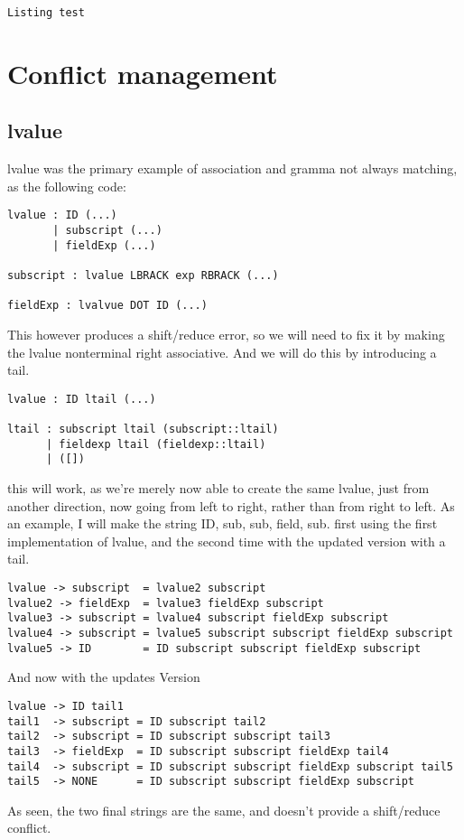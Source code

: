 \documentclass{article}
\begin{document}
\begin{lstlisting}[frame=single]
Listing test
\end{lstlisting}

\section{Conflict management}

\subsection{lvalue}
lvalue was the primary example of association and gramma not always matching, as the following code:
\begin{lstlisting}[frame=single]
lvalue : ID (...)
	   | subscript (...)
	   | fieldExp (...)

subscript : lvalue LBRACK exp RBRACK (...)

fieldExp : lvalvue DOT ID (...)

\end{lstlisting}

This however produces a shift/reduce error, so we will need to fix it by making the lvalue nonterminal right associative. And we will do this by introducing a tail.

\begin{lstlisting}[frame=single]
lvalue : ID ltail (...)

ltail : subscript ltail (subscript::ltail)
      | fieldexp ltail (fieldexp::ltail)
      | ([])
\end{lstlisting}

this will work, as we're merely now able to create the same lvalue, just from another direction, now going from left to right, rather than from right to left.
As an example, I will make the string ID, sub, sub, field, sub. first using the first implementation of lvalue, and the second time with the updated version with a tail.

\begin{lstlisting}[frame=single]
lvalue -> subscript  = lvalue2 subscript
lvalue2 -> fieldExp  = lvalue3 fieldExp subscript
lvalue3 -> subscript = lvalue4 subscript fieldExp subscript
lvalue4 -> subscript = lvalue5 subscript subscript fieldExp subscript
lvalue5 -> ID        = ID subscript subscript fieldExp subscript
\end{lstlisting}
And now with the updates Version
\begin{lstlisting}[frame=single]
lvalue -> ID tail1
tail1  -> subscript = ID subscript tail2
tail2  -> subscript = ID subscript subscript tail3
tail3  -> fieldExp  = ID subscript subscript fieldExp tail4
tail4  -> subscript = ID subscript subscript fieldExp subscript tail5
tail5  -> NONE      = ID subscript subscript fieldExp subscript
\end{lstlisting}
As seen, the two final strings are the same, and doesn't provide a shift/reduce conflict.
\end{document}
